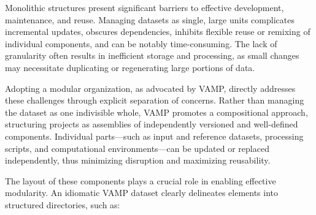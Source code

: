 \documentclass{article}
\begin{document}
Monolithic structures present significant barriers to effective development, maintenance, and reuse.
Managing datasets as single, large units complicates incremental updates, obscures dependencies, inhibits flexible reuse or remixing of individual components, and can be notably time-consuming.
The lack of granularity often results in inefficient storage and processing, as small changes may necessitate duplicating or regenerating large portions of data.


Adopting a modular organization, as advocated by VAMP, directly addresses these challenges through explicit separation of concerns.
Rather than managing the dataset as one indivisible whole, VAMP promotes a compositional approach, structuring projects as assemblies of independently versioned and well-defined components.
Individual parts—such as input and reference datasets, processing scripts, and computational environments—can be updated or replaced independently, thus minimizing disruption and maximizing reusability.

The layout of these components plays a crucial role in enabling effective modularity.
An idiomatic VAMP dataset clearly delineates elements into structured directories, such as:
\end{document}
